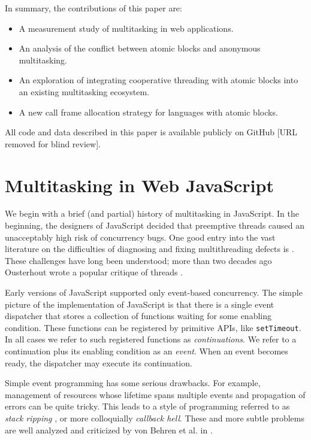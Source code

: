 \documentclass[acmsmall,anonymous,review]{acmart}\settopmatter{printfolios=true,printccs=false,printacmref=false}
\begin{document}
In summary, the contributions of this paper are:
\begin{itemize}
\item A measurement study of multitasking in web applications.
\item An analysis of the conflict between atomic blocks and anonymous multitasking.
\item An exploration of integrating cooperative threading with atomic blocks into an existing multitasking ecosystem.
\item A new call frame allocation strategy for languages with atomic blocks.
\end{itemize}

All code and data described in this paper is available publicly on GitHub [URL removed for blind review].

\section{Multitasking in Web JavaScript}

We begin with a brief (and partial) history of multitasking in JavaScript.
In the beginning, the designers of JavaScript decided that preemptive threads caused an unacceptably high risk of concurrency bugs.
One good entry into the vast literature on the difficulties of diagnosing and fixing multithreading defects is \cite{Lu2008}.
These challenges have long been understood; more than two decades ago Ousterhout wrote a popular critique of threads \cite{Ousterhout1996}.

Early versions of JavaScript supported only event-based concurrency.
The simple picture of the implementation of JavaScript is that there is a single event dispatcher that stores a collection of functions waiting for some enabling condition.
These functions can be registered by primitive APIs, like \texttt{setTimeout}.
In all cases we refer to such registered functions as \emph{continuations}.
We refer to a continuation plus its enabling condition as an \emph{event}.
When an event becomes ready, the dispatcher may execute its continuation.

Simple event programming has some serious drawbacks.
For example, management of resources whose lifetime spans multiple events and propagation of errors can be quite tricky.
This leads to a style of programming referred to as \emph{stack ripping} \cite{Adya2002}, or more colloquially \emph{callback hell}.
These and more subtle problems are well analyzed and criticized by von Behren et al. in \cite{Behren2003a}.
\end{document}
